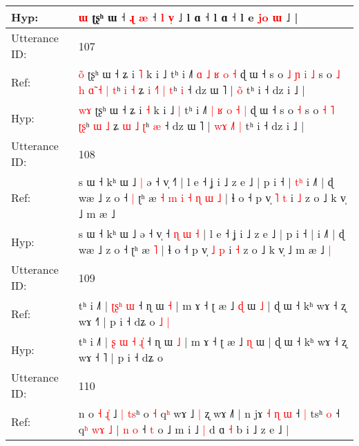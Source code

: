 \documentclass[10pt]{article}
\DeclareRobustCommand{\hl}[1]{{\textcolor{red}{#1}}}
\begin{document}
\begin{longtable}{ll}
 \\
Hyp: & \hl{}\hl{}\hl{}\hl{}\hl{}\hl{}\hl{}\hl{ɯ} ʈʂʰ ɯ ˧ \hl{ɻ} \hl{æ} ˧\hl{}\hl{}\hl{}\hl{}\hl{}\hl{} \hl{l} \hl{}\hl{v}\hl{̩} ˩ l ɑ ˧ l ɑ ˧\hl{}\hl{} l e \hl{j}\hl{o}\hl{ }\hl{ɯ} ˩ |
 \\
\midrule
Utterance ID: & 107 \\
Ref: & \hl{o}\hl{̃} ʈʂʰ ɯ ˧ ʑ i \hl{˥} k i ˩\hl{}\hl{} tʰ i ˩˥ \hl{ɑ} \hl{˩} \hl{ʁ} \hl{o} \hl{˧} ɖ ɯ ˧ s o\hl{ }\hl{˩}\hl{ }\hl{ɲ}\hl{ }\hl{i} \hl{˩} s o\hl{ }\hl{˩}\hl{ }\hl{h} \hl{ɑ}\hl{̃} \hl{˧} \hl{|}\hl{ }\hl{t}ʰ \hl{i} \hl{˧} ʑ\hl{ }\hl{i} \hl{˧}\hl{˥} \hl{|} \hl{t}ʰ \hl{i} ˧ dz ɯ ˥ |\hl{}\hl{}\hl{} \hl{}\hl{}\hl{o}\hl{̃} tʰ i ˧ dz i ˩ |
 \\
Hyp: & \hl{w}\hl{ɤ} ʈʂʰ ɯ ˧ ʑ i \hl{˧} k i ˩\hl{ }\hl{|} tʰ i ˩˥ \hl{|} \hl{ʁ} \hl{o} \hl{˧} \hl{|} ɖ ɯ ˧ s o\hl{}\hl{}\hl{}\hl{}\hl{}\hl{} \hl{˧} s o\hl{}\hl{}\hl{}\hl{} \hl{}\hl{˧} \hl{˥} \hl{}\hl{ʈ}\hl{ʂ}ʰ \hl{ɯ} \hl{˩} ʑ\hl{}\hl{} \hl{}\hl{ɯ} \hl{˩} \hl{ʈ}ʰ \hl{æ} ˧ dz ɯ ˥ |\hl{ }\hl{w}\hl{ɤ} \hl{˩}\hl{˥}\hl{ }\hl{|} tʰ i ˧ dz i ˩ |
 \\
\midrule
Utterance ID: & 108 \\
Ref: & s ɯ ˧ kʰ ɯ ˩\hl{ }\hl{|} ə ˧ v̩ ˧\hl{}\hl{}\hl{}\hl{}\hl{}\hl{˥} | l e ˧ ʝ i ˩ z e ˩ | p i ˧ |\hl{ }\hl{t}\hl{ʰ} i ˩˥ | ɖ wæ ˩ z o ˧\hl{ }\hl{|} ʈʰ æ\hl{ }\hl{˧}\hl{ }\hl{m}\hl{ }\hl{i}\hl{ }\hl{˧}\hl{ }\hl{ɳ}\hl{ }\hl{ɯ} \hl{˩} | ɬ o ˧ p v̩ \hl{˥} \hl{t} i \hl{˩} z o ˩ k v̩ ˩ m æ ˩\hl{}\hl{}
 \\
Hyp: & s ɯ ˧ kʰ ɯ ˩\hl{}\hl{} ə ˧ v̩ ˧\hl{ }\hl{ɳ}\hl{ }\hl{ɯ}\hl{ }\hl{˧} | l e ˧ ʝ i ˩ z e ˩ | p i ˧ |\hl{}\hl{}\hl{} i ˩˥ | ɖ wæ ˩ z o ˧\hl{}\hl{} ʈʰ æ\hl{}\hl{}\hl{}\hl{}\hl{}\hl{}\hl{}\hl{}\hl{}\hl{}\hl{}\hl{} \hl{˥} | ɬ o ˧ p v̩ \hl{˩} \hl{p} i \hl{˧} z o ˩ k v̩ ˩ m æ ˩\hl{ }\hl{|}
 \\
\midrule
Utterance ID: & 109 \\
Ref: & tʰ i ˩˥ |\hl{}\hl{} \hl{ʈ}\hl{ʂ}\hl{ʰ} \hl{}\hl{ɯ} ˧ ɳ ɯ \hl{˧} | m ɤ ˧ ʈ æ ˩ \hl{ɖ} ɯ\hl{ }\hl{˩} | ɖ ɯ ˧ kʰ wɤ ˧ ʐ wɤ ˧\hl{}˥ | p i ˧ dʑ o\hl{ }\hl{˩}\hl{ }\hl{|}
 \\
Hyp: & tʰ i ˩˥ |\hl{ }\hl{ʂ} \hl{ɯ}\hl{ }\hl{˧} \hl{ɻ}\hl{̍} ˧ ɳ ɯ \hl{˩} | m ɤ ˧ ʈ æ ˩ \hl{ɳ} ɯ\hl{}\hl{} | ɖ ɯ ˧ kʰ wɤ ˧ ʐ wɤ ˧\hl{ }˥ | p i ˧ dʑ o\hl{}\hl{}\hl{}\hl{}
 \\
\midrule
Utterance ID: & 110 \\
Ref: & n o\hl{ }\hl{˧} \hl{ɻ}\hl{̍} ˩\hl{ }\hl{|} \hl{t}\hl{s}ʰ o \hl{˧} q\hl{ʰ} wɤ ˩\hl{ }\hl{|} ʐ wɤ ˩˥ | n jɤ\hl{ }\hl{˧}\hl{ }\hl{ɳ}\hl{ }\hl{ɯ} ˧\hl{ }\hl{|} tsʰ\hl{ }\hl{o} ˧ q\hl{ʰ} \hl{w}\hl{ɤ} \hl{˩} | \hl{n} \hl{o} ˧ \hl{t} o ˩ m i ˩\hl{ }\hl{|} d ɑ \hl{˧} b i ˩ z e ˩ |

\end{longtable}
\end{document}

